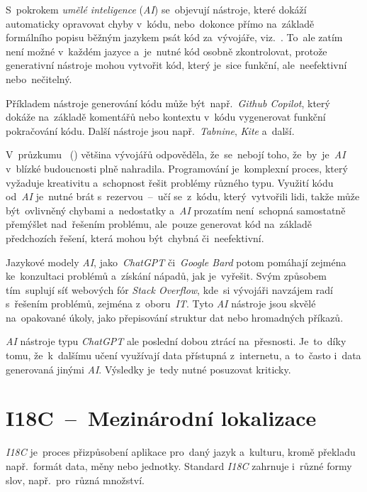 \documentclass[11pt,a4paper]{report}
\begin{document}
            S~pokrokem \emph{umělé inteligence} (\emph{AI}) se~objevují nástroje, které dokáží automaticky opravovat chyby v~kódu, nebo~dokonce přímo na~základě formálního popisu běžným jazykem psát kód za~vývojáře, viz.~\cite{pasek:generovanizdroju}. To~ale zatím není možné v~každém jazyce a~je~nutné kód osobně zkontrolovat, protože generativní nástroje mohou vytvořit kód, který je~sice funkční, ale~neefektivní nebo~nečitelný.

            Příkladem nástroje generování kódu může být~např.~\emph{Github Copilot}, který dokáže na~základě komentářů nebo kontextu v~kódu vygenerovat funkční pokračování kódu. Další nástroje jsou např.~\emph{Tabnine}, \emph{Kite} a~další. \cite{sz:AI}
            
            V~průzkumu ~(\cite{zerotomasteryStateOfAI}) většina vývojářů odpověděla, že~se~nebojí toho, že~by~je~\emph{AI} v~blízké budoucnosti plně nahradila. Programování je~komplexní proces, který vyžaduje kreativitu a~schopnost řešit problémy různého typu. Využití kódu od~\emph{AI} je~nutné brát s~rezervou~--~učí se~z~kódu, který~vytvořili lidi, takže může být~ovlivněný chybami a~nedostatky a~\emph{AI} prozatím není~schopná samostatně přemýšlet nad~řešením problému, ale~pouze generovat kód na~základě předchozích řešení, která mohou být~chybná či~neefektivní.
            
            Jazykové modely \emph{AI}, jako~\emph{ChatGPT} či~\emph{Google Bard} potom pomáhají zejména ke~konzultaci problémů a~získání nápadů, jak je~vyřešit. Svým způsobem tím~suplují síť webových fór \emph{Stack Overflow}, kde~si vývojáři navzájem radí s~řešením problémů, zejména z~oboru~\emph{IT}. Tyto \emph{AI} nástroje jsou skvělé na~opakované úkoly, jako přepisování struktur dat nebo hromadných příkazů.

            \emph{AI} nástroje typu \emph{ChatGPT} ale poslední dobou ztrácí na~přesnosti. Je~to~díky tomu, že~k~dalšímu učení využívají data přístupná z~internetu, a~to~často i~data generovaná jinými \emph{AI}. Výsledky je~tedy nutné posuzovat kriticky. \cite{computerworld:AI}

        \section{I18C~--~Mezinárodní lokalizace}
            \emph{I18C} je~proces přizpůsobení aplikace pro~daný jazyk a~kulturu, kromě překladu např.~formát data, měny nebo jednotky. Standard \emph{I18C} zahrnuje i~různé formy slov, např.~pro~různá množství. \cite{w3Internationalization}
\end{document}

